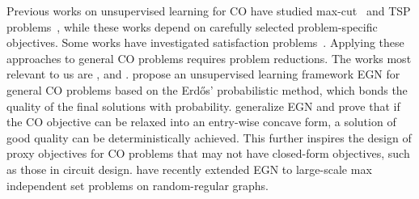 Previous works on unsupervised learning for CO have studied max-cut~\citep{yao2019experimental} and TSP problems~\citep{hudson2021graph}, while these works depend on carefully selected problem-specific objectives. Some works have investigated satisfaction problems~\citep{amizadeh2018learning,toenshoff2019run}. Applying these approaches to general CO problems requires problem reductions. The works most relevant to us are \citep{karalias2020erdos}, \citep{wang2022unsupervised} and \citep{schuetz2022combinatorial}. \cite{karalias2020erdos} propose an unsupervised learning framework EGN for general CO problems based on the Erd\H{o}s' probabilistic method, which bonds the quality of the final solutions with probability. \cite{wang2022unsupervised} generalize EGN and prove that if the CO objective can be relaxed into an entry-wise concave form, a solution of good quality can be deterministically achieved. This further inspires the design of proxy objectives for CO problems that may not have closed-form objectives, such as those in circuit design. \cite{schuetz2022combinatorial} have recently extended EGN to large-scale max independent set problems on random-regular graphs.



